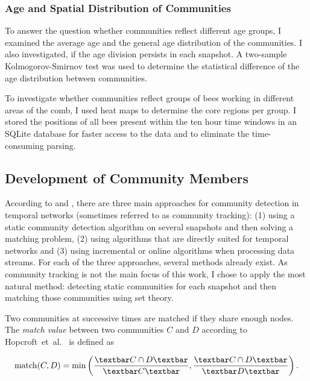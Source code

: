\subsubsection{Age and Spatial Distribution of Communities}
To answer the question whether communities reflect different age groups, I examined the average age and the general age distribution of the communities.
I also investigated, if the age division persists in each snapshot.
A two-sample Kolmogorov-Smirnov test was used to determine the statistical difference of the age distribution between communities.

To investigate whether communities reflect groups of bees working in different areas of the comb, I used heat maps to determine the core regions per group.
I stored the positions of all bees present within the ten hour time windows in an SQLite database for faster access to the data and to eliminate the time-consuming parsing.

\subsection{Development of Community Members}
\label{sec:bg:tracking}
According to \textcite{aynaud2013communities} and  \textcite{brodka2014community}, there are three main approaches for community detection in temporal networks (sometimes referred to as community tracking): (1) using a static community detection algorithm on several snapshots and then solving a matching problem, (2) using algorithms that are directly suited for temporal networks and (3) using incremental or online algorithms when processing data streams.
For each of the three approaches, several methods already exist.
As community tracking is not the main focus of this work, I chose to apply the most natural method: detecting static communities for each snapshot and then matching those communities using set theory.

Two communities at successive times are matched if they share enough nodes.
The \emph{match value} between two communities $C$ and $D$ according to Hopcroft~et~al.~\cite{hopcroft2004tracking} is defined as

\begin{equation}
\label{eq:match}
\text{match}(C,D) = \text{min}\left( \frac{\textbar C\cap D \textbar}{\textbar C\textbar }, \frac{\textbar C\cap D \textbar}{\textbar D \textbar }\right).
\end{equation}

